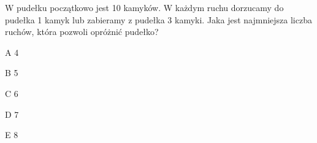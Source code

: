 \begin{tresc}
W pudełku początkowo jest 10 kamyków. W każdym ruchu dorzucamy do pudełka 1 kamyk lub zabieramy z pudełka 3 kamyki. Jaka jest najmniejsza liczba ruchów, która pozwoli opróżnić pudełko?
\end{tresc}
\begin{wariant}{A} 4 \end{wariant}
\begin{wariant}{B} 5 \end{wariant}
\begin{wariant}{C} 6 \end{wariant}
\begin{wariant}{D} 7 \end{wariant}
\begin{wariant}{E} 8 \end{wariant}
